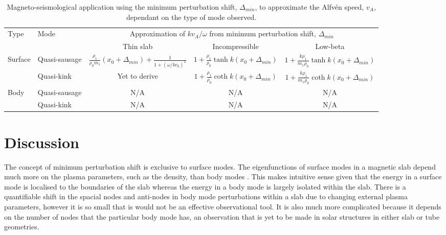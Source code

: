 \documentclass[namedreferences]{solarphysics}
\numberwithin{equation}{section}
\begin{document}
\begin{article}
\begin{landscape}
\begin{table}
\caption{Magneto-seismological application using the minimum perturbation shift, $\Delta_{min}$, to approximate the Alfv\'{e}n speed, $v_A$, dependant on the type of mode observed.}
\label{table label}
\begin{tabular}{llccc}
  \toprule
Type & Mode & \multicolumn{3}{c}{Approximation of $kv_A / \omega$ from minimum perturbation shift, $\Delta_{min}$} \\
\cmidrule(lr){3-5}
	 &	    & Thin slab & Incompressible & Low-beta \\
  \midrule
\multirow{2}{*}{Surface} & Quasi-sausage & $ \frac{\rho_1}{\rho_0m_1}(x_0 + \Delta_{min}) + \frac{1}{1 + (\omega / kc_0)^2} $ & $ 1 + \frac{\rho_1}{\rho_0}\tanh{k(x_0 + \Delta_{min})} $ & $ 1 + \frac{k\rho_1}{m_1\rho_0}\tanh{k(x_0 + \Delta_{min})} $ \\
						   & Quasi-kink	   & Yet to derive & $ 1 + \frac{\rho_1}{\rho_0}\coth{k(x_0 + \Delta_{min})} $ & $ 1 + \frac{k\rho_1}{m_1\rho_0}\coth{k(x_0 + \Delta_{min})} $ \\
\multirow{2}{*}{Body}    & Quasi-sausage & N/A & N/A & N/A \\
						   & Quasi-kink	   & N/A & N/A & N/A \\
  \bottomrule
\end{tabular}
\end{table}

\end{landscape}
\restoregeometry



\section{Discussion}

The concept of minimum perturbation shift is exclusive to surface modes. The eigenfunctions of surface modes in a magnetic slab depend much more on the plasma parameters, such as the density, than body modes \citep{all_etal17}. This makes intuitive sense given that the energy in a surface mode is localised to the boundaries of the slab whereas the energy in a body mode is largely isolated within the slab. There is a quantifiable shift in the spacial nodes and anti-nodes in body mode perturbations within a slab due to changing external plasma parameters, however it is so small that is would not be an effective observational tool. It is also much more complicated because it depends on the number of nodes that the particular body mode has, an observation that is yet to be made in solar structures in either slab or tube geometries.






\end{article} 
\end{document}
